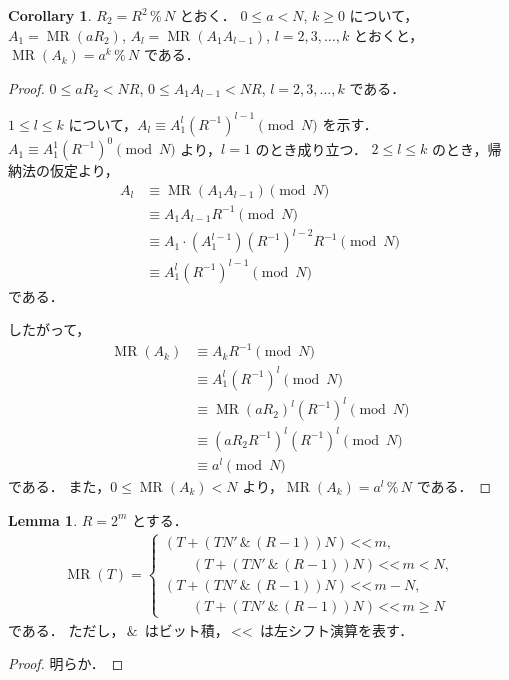 \documentclass[twocolumn, uplatex, dvipdfmx]{jsarticle}
\renewcommand{\ge}{\geqslant}
\renewcommand{\le}{\leqslant}
\numberwithin{equation}{section}
\theoremstyle{definition}
\newtheorem{lem}{Lemma}[section]
\newtheorem{cor}{Corollary}[section]
\newcommand{\Mod}{\,\texttt{\%}\,}
\newcommand{\BitAnd}{\,\texttt{\&}\,}
\newcommand{\LeftShift}{\,\texttt{<<}\,}
\DeclareMathOperator{\MR}{\mathrm{MR}}
\begin{document}
\begin{cor}
	$R_2=R^2\Mod N$ とおく．
	$0\le a<N$, $k\ge0$ について，
	$A_1=\MR(aR_2)$, $A_l=\MR(A_1A_{l-1})$, $l=2,3,\dots,k$ とおくと，$\MR(A_k)=a^k\Mod N$ である．
\end{cor}
\begin{proof}
	$0\le aR_2<NR$, $0\le A_1A_{l-1}<NR$, $l=2,3,\dots,k$ である．

	$1\le l\le k$ について，$A_l\equiv A_1^l(R^{-1})^{l-1}\pmod{N}$ を示す．
	$A_1\equiv A_1^1(R^{-1})^0\pmod{N}$ より，$l=1$ のとき成り立つ．
	$2\le l\le k$ のとき，帰納法の仮定より，
	\begin{align*}
		A_l&\equiv\MR(A_1A_{l-1})\pmod{N}\\
		&\equiv A_1A_{l-1}R^{-1}\pmod{N}\\
		&\equiv A_1\cdot (A_1^{l-1})(R^{-1})^{l-2}R^{-1}\pmod{N}\\
		&\equiv A_1^l(R^{-1})^{l-1}\pmod{N}
	\end{align*}
	である．

	したがって，
	\begin{align*}
		\MR(A_k)&\equiv A_kR^{-1}\pmod{N}\\
		&\equiv A_1^l(R^{-1})^l\pmod{N}\\
		&\equiv \MR(aR_2)^l(R^{-1})^l\pmod{N}\\
		&\equiv (aR_2R^{-1})^l(R^{-1})^l\pmod{N}\\
		&\equiv a^l\pmod{N}
	\end{align*}
	である．
	また，$0\le\MR(A_k)<N$ より，$\MR(A_k)=a^l\Mod N$ である．
\end{proof}

\begin{lem}
	$R=2^m$ とする．
	\begin{align*}
		\MR(T)=\begin{cases}
			(T+(TN'\BitAnd (R-1))N)\LeftShift m,\\
			\qquad (T+(TN'\BitAnd (R-1))N)\LeftShift m<N,\\
			(T+(TN'\BitAnd (R-1))N)\LeftShift m-N,\\
			\qquad (T+(TN'\BitAnd (R-1))N)\LeftShift m\ge N
		\end{cases}
	\end{align*}
	である．
	ただし，$\BitAnd$ はビット積，$\LeftShift$ は左シフト演算を表す．
\end{lem}
\begin{proof}
	明らか．
\end{proof}
\end{document}
